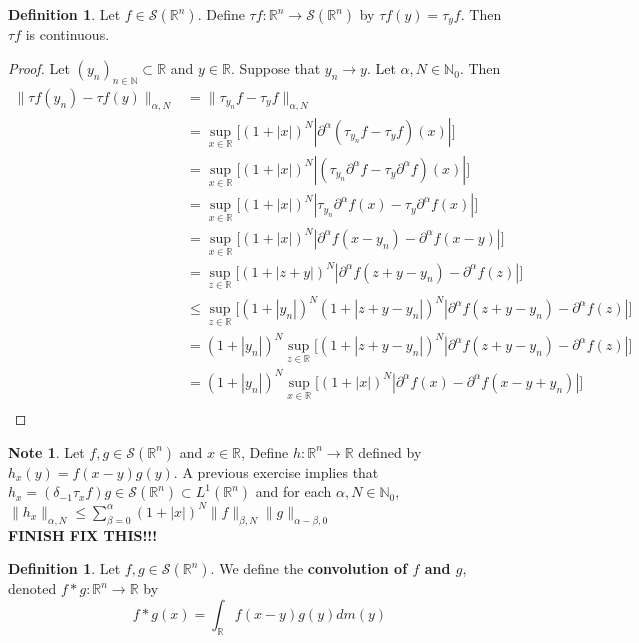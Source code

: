 \documentclass[12pt]{amsart}
\theoremstyle{definition}
\newtheorem{defn}[definition]{Definition}
\newtheorem{note}[definition]{Note}
\newcommand{\p}{\partial}
\newcommand{\al}{\alpha}
\newcommand{\be}{\beta}
\newcommand{\del}{\delta}
\newcommand{\N}{\mathbb{N}}
\newcommand{\R}{\mathbb{R}}
\newcommand{\MS}{\mathcal{S}}
\begin{document}
	\begin{defn}
		Let $f \in \MS(\R^n)$. Define $\tau f: \R^n \rightarrow \MS(\R^n)$ by $\tau f(y) = \tau_y f$. Then $\tau f$ is continuous.
	\end{defn}

	\begin{proof}
		Let $(y_n)_{n \in \N} \subset \R$ and $y \in \R$. Suppose that $y_n \rightarrow y$. Let $\al, N \in \N_0$. Then 
		\begin{align*}
			\|\tau f (y_n) - \tau f (y) \|_{\al, N}
			& = \|\tau_{y_n} f - \tau_y f  \|_{\al, N} \\
			& = \sup_{x \in \R} \bigg[ (1 + |x|)^N |\p^{\al}(\tau_{y_n}f - \tau_y f)(x)|\bigg] \\
			& = \sup_{x \in \R} \bigg[(1 + |x|)^N |(\tau_{y_n} \p^{\al}f - \tau_y \p^{\al}f)(x)|\bigg] \\
			& = \sup_{x \in \R} \bigg[(1 + |x|)^N |\tau_{y_n} \p^{\al}f(x) - \tau_y \p^{\al}f(x)|\bigg] \\
			& = \sup_{x \in \R} \bigg[(1 + |x|)^N |\p^{\al}f(x - y_n) - \p^{\al}f(x - y)|\bigg] \\
			& = \sup_{z \in \R} \bigg[(1 + |z + y|)^N |\p^{\al}f(z  + y - y_n) - \p^{\al}f(z)|\bigg] \\
			& \leq \sup_{z \in \R} \bigg[(1 + |y_n|)^N(1 + |z  + y - y_n|)^N |\p^{\al}f(z  + y - y_n) - \p^{\al}f(z)|\bigg] \\
			& = (1 + |y_n|)^N\sup_{z \in \R} \bigg[(1 + |z  + y - y_n|)^N |\p^{\al}f(z  + y - y_n) - \p^{\al}f(z)|\bigg] \\
			& = (1 + |y_n|)^N\sup_{x \in \R} \bigg[(1 + |x|)^N |\p^{\al}f(x) - \p^{\al}f(x - y + y_n)|\bigg] \\
		\end{align*}
	\end{proof}

	

	\begin{note}
		 Let $f,g \in \MS(\R^n)$ and $x \in \R$, Define $h: \R^n \rightarrow \R$ defined by $h_x(y) = f(x-y)g(y)$. A previous exercise implies that $h_x = (\del_{-1} \tau_xf)g \in \MS(\R^n) \subset L^1(\R^n)$ and for each $\al, N \in \N_0$, $\|h_x\|_{\al, N} \leq \sum_{\be=0}^{\al} (1+|x|)^N\|f\|_{\be, N} \|g\|_{\al - \be, 0} $ \\
		 \textbf{FINISH FIX THIS!!!}
	\end{note}

	\begin{defn}
		Let $f, g \in \MS(\R^n)$. We define the \textbf{convolution of $f$ and $g$}, denoted $f * g: \R^n \rightarrow \R$ by $$f*g(x) = \int_{\R} f(x-y)g(y) dm(y)$$
	\end{defn}
\end{document}
